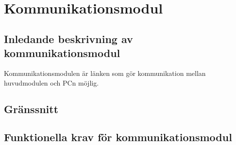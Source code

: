 \section{Kommunikationsmodul}

\subsection{Inledande beskrivning av kommunikationsmodul}
Kommunikationsmodulen är länken som gör kommunikation mellan huvudmodulen och PCn möjlig.

\subsection{Gränssnitt}
\begin{LIPSkravlista}
\end{LIPSkravlista}

\subsection{Funktionella krav för kommunikationsmodul}
\begin{LIPSkravlista}
\end{LIPSkravlista}